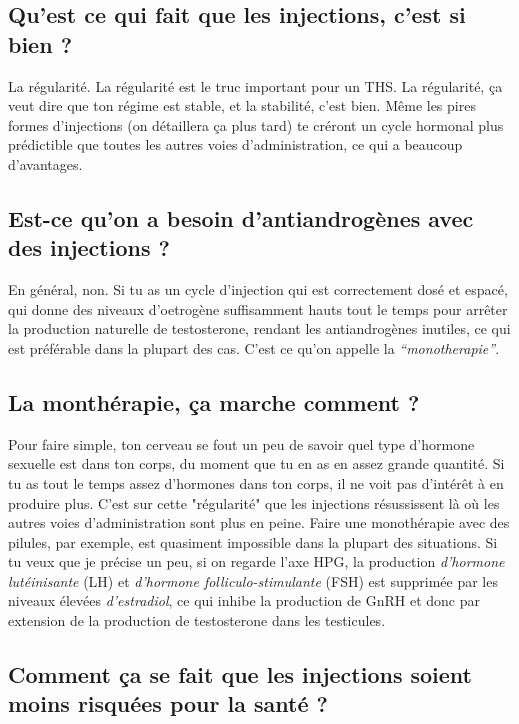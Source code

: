 \documentclass{article}
\begin{document}
\subsection{Qu'est ce qui fait que les injections, c'est si bien ?}

La régularité. La régularité est le truc important pour un THS. La régularité, ça veut dire que ton régime est stable, et la stabilité, c'est bien. Même les pires formes d'injections (on détaillera ça plus tard) te créront un cycle hormonal plus prédictible que toutes les autres voies d'administration, ce qui a beaucoup d'avantages.

\subsection{Est-ce qu'on a besoin d'antiandrogènes avec des injections ?}

En général, non. Si tu as un cycle d'injection qui est correctement dosé et espacé, qui donne des niveaux d'oetrogène suffisamment hauts tout le temps pour arrêter la production naturelle de testosterone, rendant les antiandrogènes inutiles, ce qui est préférable dans la plupart des cas. C'est ce qu'on appelle la \textit{“monotherapie”}.

\subsection{La monthérapie, ça marche comment ?}\label{2-3}

Pour faire simple, ton cerveau se fout un peu de savoir quel type d'hormone sexuelle est dans ton corps, du moment que tu en as en assez grande quantité. Si tu as tout le temps assez d'hormones dans ton corps, il ne voit pas d'intérêt à en produire plus. C'est sur cette "régularité" que les injections résussissent là où les autres voies d'administration sont plus en peine. Faire une monothérapie avec des pilules, par exemple, est quasiment impossible dans la plupart des situations. Si tu veux que je précise un peu, si on regarde l'axe HPG, la production \textit{d'hormone lutéinisante} (LH) et \textit{d'hormone folliculo-stimulante} (FSH) est supprimée par les niveaux élevées \textit{d'estradiol}, ce qui inhibe la production de GnRH et donc par extension de la production de testosterone dans les testicules. 

\subsection{Comment ça se fait que les injections soient moins risquées pour la santé ?}
\end{document}
